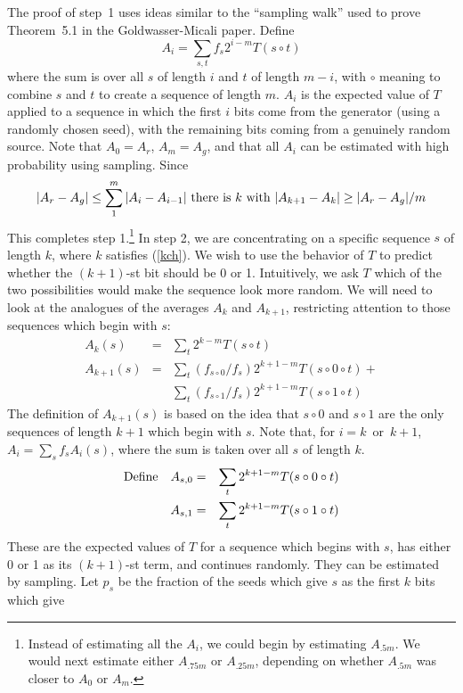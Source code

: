 \pq The proof of step~1 uses ideas similar to the ``sampling walk'' used
to prove Theorem~5.1 in the Goldwasser-Micali paper.  Define
$$A_i=\sum_{s,t}f_s2^{i-m}T(s\circ t)$$where the sum is over all $s$ of length
$i$ and $t$ of length $m-i$, with $\circ$ meaning to combine
$s$ and $t$ to create a sequence of length $m$.
$A_i$ is the expected value of $T$ applied to a sequence in which the
first $i$ bits come from the generator (using a randomly chosen seed),
with the remaining bits coming from a genuinely random source.
\pq Note that $A_0=A_r$, $A_m=A_g$, and that all $A_i$ can be 
estimated with high probability using sampling. Since\begin{equation}
|A_r-A_g|\le\sum_1^{m}|A_i-A_{i-1}|\hbox{ there is $k$ with }
|A_{k+1}-A_{k}|\ge |A_r-A_g|/m\label{kch}\end{equation}
  This completes step 1.\footnote{Instead of estimating
all the $A_i$, we could begin by estimating $A_{.5m}$.  We would next
estimate either $A_{.75m}$ or $A_{.25m}$, depending on whether $A_{.5m}$
was closer to $A_0$ or $A_m$.}
\pq In step 2, we are concentrating on a specific sequence $s$ of length
$k$, where $k$ satisfies (\ref{kch}).  We
wish to use the behavior of $T$ to predict whether the $(k+1)$-st bit
should be 0 or 1.  Intuitively, we ask $T$ which of the two possibilities
would make the sequence look more random.  
\pq We will need to look at the analogues of the averages $A_k$ and
$A_{k+1}$, restricting attention to those sequences which begin with
$s$:\begin{eqnarray*}A_k(s)&=&\sum_t2^{k-m}T(s\circ t)\\
A_{k+1}(s)&=&\sum_t(f_{s\circ0}/f_s)2^{k+1-m}T(s\circ0\circ t)+\\
&&\sum_t(f_{s\circ1}/f_s)2^{k+1-m}T(s\circ1\circ t)\end{eqnarray*}
The definition of $A_{k+1}(s)$ is based on the idea that $s\circ0$
and $s\circ1$ are the only sequences of length $k+1$ which begin with $s$.
Note that, for $i=k$~or~$k+1$, $A_i=\sum_sf_sA_i(s)$, where the
sum is taken over all $s$ of length $k$.
\begin{eqnarray*}\hbox{Define\quad}A_{s,0}&=&\sum_t2^{k+1-m}
T(s\circ0\circ t)\\
A_{s,1}&=&\sum_t2^{k+1-m}T(s\circ1\circ t)\end{eqnarray*}
These are the expected values of $T$ for a sequence which begins with $s$, has
either 0 or 1 as its $(k+1)$-st term, and continues randomly.  They
can be estimated by sampling.  Let $p_s$ be the
fraction of the seeds which give $s$ as the first $k$ bits which give
